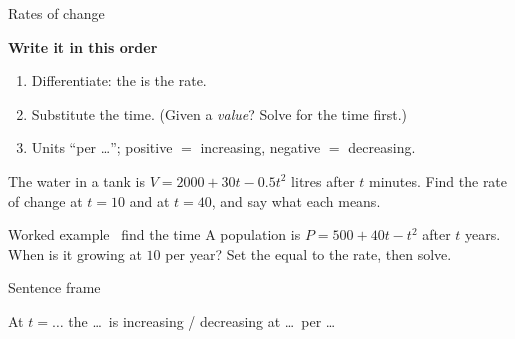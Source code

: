 \documentclass[aspectratio=169,11pt,t,xcolor=table]{beamer}
\begin{document}
\begin{frame}{Rates of change}\relax
{\sEmph\bfseries Write it in this order\par}\vskip1mm
\begin{enumerate}
\item Differentiate: the \tderiv is the rate.
\item Substitute the time. (Given a \emph{value}? Solve for the time first.)
\item Units ``per \dots''; positive $=$ increasing, negative $=$ decreasing.
\end{enumerate}
\vskip2mm
 The water in a tank is $V=2000+30t-0.5t^{2}$ litres after $t$ minutes. Find the rate of change at $t=10$ and at $t=40$, and say what each means.
\end{frame}

\begin{frame}{Worked example \textperiodcentered\ find the time}\relax
{} A population is $P=500+40t-t^{2}$ after $t$ years. When is it growing at $10$ per year?
\vskip5mm
Set the \tderiv equal to the rate, then solve.
\vskip5mm
{\sEmph Sentence frame\par}\vskip1mm
At $t=\dots$ the \dots\ is increasing / decreasing at \dots\ per \dots
{}
\end{frame}
\end{document}
